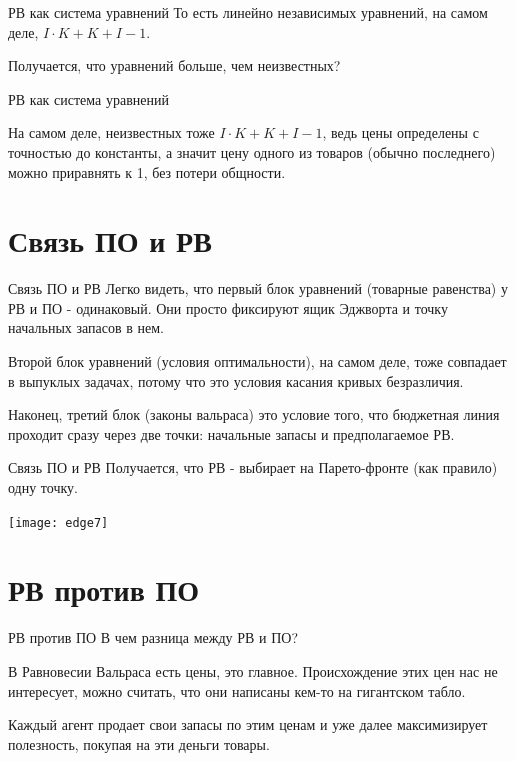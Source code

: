 \documentclass{beamer}
\begin{document}
\begin{frame}{РВ как система уравнений}
То есть линейно независимых уравнений, на самом деле, $I\cdot K + K + I - 1$.

Получается, что уравнений больше, чем неизвестных?

\end{frame}

\begin{frame}{РВ как система уравнений}

На самом деле, неизвестных тоже $I\cdot K + K + I - 1$, ведь цены определены с точностью до константы, а значит цену одного из товаров (обычно последнего) можно приравнять к 1, без потери общности.

\end{frame}

\section{Связь ПО и РВ}
\begin{frame}{Связь ПО и РВ}
Легко видеть, что первый блок уравнений (товарные равенства) у РВ и ПО - одинаковый. Они просто фиксируют ящик Эджворта и точку начальных запасов в нем.

Второй блок уравнений (условия оптимальности), на самом деле, тоже совпадает в выпуклых задачах, потому что это условия касания кривых безразличия.

Наконец, третий блок (законы вальраса) это условие того, что бюджетная линия проходит сразу через две точки: начальные запасы и предполагаемое РВ.
\end{frame}

\begin{frame}{Связь ПО и РВ}
Получается, что РВ - выбирает на Парето-фронте (как правило) одну точку.
\begin{center}
     \texttt{[image: edge7]}
     \end{center}
\end{frame}

\section{РВ против ПО}

\begin{frame}{РВ против ПО}
В чем разница между РВ и ПО?

\alert{В Равновесии Вальраса есть цены}, это главное. Происхождение этих цен нас не интересует, можно считать, что они написаны кем-то на гигантском табло. 

Каждый агент продает свои запасы по этим ценам и уже далее максимизирует полезность, покупая на эти деньги товары.

\end{frame}
\end{document}
